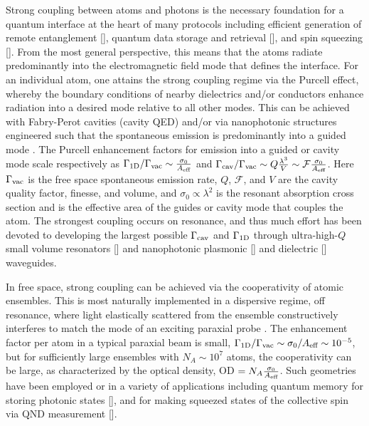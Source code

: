 \documentclass[preprint,aps,pra,onecolumn]{revtex4-1} %
\newcommand{\oneD}{{\rm 1D}}
\newcommand{\vac}{{\rm vac}}
\newcommand{\cav}{{\rm cav}}
\begin{document}
Strong coupling between atoms and photons is the necessary foundation for a quantum interface at the 
heart of many protocols including efficient generation of remote entanglement [], quantum data storage 
and retrieval [], and  spin squeezing []. From the most general perspective, this means that the atoms 
radiate predominantly into the electromagnetic field mode that defines the interface.  For an 
individual atom, one attains the strong coupling regime via the Purcell effect, whereby the boundary 
conditions of nearby dielectrics and/or conductors enhance radiation into a desired mode relative to all 
other modes.  This can be achieved with Fabry-Perot cavities (cavity QED) \cite{} and/or via nanophotonic structures engineered such that the spontaneous emission is predominantly into a guided mode \cite{manga_rao_single_2007,hakuta_manipulating_2012, hung_trapped_2013}.  The Purcell enhancement factors for emission into a guided or cavity mode scale respectively as  $ \Gamma_{\oneD}/\Gamma_{\vac} \sim \frac{\sigma_0}{A_{\eff}}$ and  
$\Gamma_{\cav}/\Gamma_{\vac} \sim   Q \frac{\lambda^3}{V}\sim \mathcal{F}  \frac{\sigma_0}{A_{\eff}}$.  
Here $\Gamma_{\vac}$ is the free space spontaneous emission rate, $Q$, $\mathcal{F}$, and $V$ are the cavity quality factor, finesse, and volume, and $\sigma_0 \propto \lambda^2$ is the resonant absorption cross 
section and is the effective area of the guides or cavity mode that couples the atom.  The strongest 
coupling occurs on resonance, and thus much effort has been devoted to developing the largest possible 
$\Gamma_{\cav}$ and $\Gamma_{\oneD}$ through ultra-high-$Q$ small volume resonators [] and 
nanophotonic plasmonic [] and dielectric [] waveguides.  

In free space, strong coupling can be achieved via the cooperativity of atomic ensembles.  This is most 
naturally implemented in a dispersive regime, off resonance, where light elastically scattered 
from the ensemble constructively interferes to match the mode of an exciting paraxial probe \cite{baragiola_three-dimensional_2014}.  The enhancement factor per atom in a typical paraxial beam is small, $\Gamma_{\oneD}/\Gamma_{\vac} \sim \sigma_0/A_{\eff}  \sim 10^{-5}$, but for sufficiently large ensembles with $N_A \sim  10^7$ atoms, the cooperativity can be large, as characterized by the optical density, OD $= N_A \frac{\sigma_0}{A_{\text{eff}}}$.  Such geometries have been employed or in a variety of applications including quantum memory for storing photonic states [], and for  making squeezed states of the collective spin via QND measurement [].   
\end{document}
